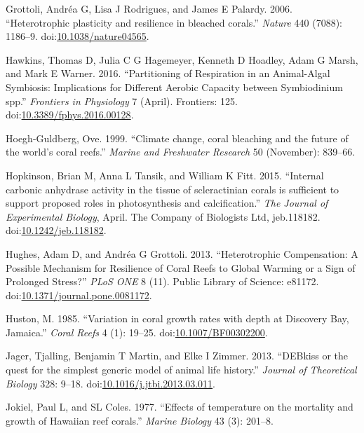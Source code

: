 \documentclass[]{elsarticle} %
\begin{document}
\hypertarget{ref-Grottoli:2006p3692}{}
Grottoli, Andréa G, Lisa J Rodrigues, and James E Palardy. 2006.
``Heterotrophic plasticity and resilience in bleached corals.''
\emph{Nature} 440 (7088): 1186--9.
doi:\href{https://doi.org/10.1038/nature04565}{10.1038/nature04565}.

\hypertarget{ref-Hawkins:2016jj}{}
Hawkins, Thomas D, Julia C G Hagemeyer, Kenneth D Hoadley, Adam G Marsh,
and Mark E Warner. 2016. ``Partitioning of Respiration in an
Animal-Algal Symbiosis: Implications for Different Aerobic Capacity
between Symbiodinium spp.'' \emph{Frontiers in Physiology} 7 (April).
Frontiers: 125.
doi:\href{https://doi.org/10.3389/fphys.2016.00128}{10.3389/fphys.2016.00128}.

\hypertarget{ref-HoeghGuldberg:1999p4222}{}
Hoegh-Guldberg, Ove. 1999. ``Climate change, coral bleaching and the
future of the world's coral reefs.'' \emph{Marine and Freshwater
Research} 50 (November): 839--66.

\hypertarget{ref-Hopkinson:2015ev}{}
Hopkinson, Brian M, Anna L Tansik, and William K Fitt. 2015. ``Internal
carbonic anhydrase activity in the tissue of scleractinian corals is
sufficient to support proposed roles in photosynthesis and
calcification.'' \emph{The Journal of Experimental Biology}, April. The
Company of Biologists Ltd, jeb.118182.
doi:\href{https://doi.org/10.1242/jeb.118182}{10.1242/jeb.118182}.

\hypertarget{ref-Hughes:2013hd}{}
Hughes, Adam D, and Andréa G Grottoli. 2013. ``Heterotrophic
Compensation: A Possible Mechanism for Resilience of Coral Reefs to
Global Warming or a Sign of Prolonged Stress?'' \emph{PLoS ONE} 8 (11).
Public Library of Science: e81172.
doi:\href{https://doi.org/10.1371/journal.pone.0081172}{10.1371/journal.pone.0081172}.

\hypertarget{ref-Huston:1985ec}{}
Huston, M. 1985. ``Variation in coral growth rates with depth at
Discovery Bay, Jamaica.'' \emph{Coral Reefs} 4 (1): 19--25.
doi:\href{https://doi.org/10.1007/BF00302200}{10.1007/BF00302200}.

\hypertarget{ref-Jager:2013bj}{}
Jager, Tjalling, Benjamin T Martin, and Elke I Zimmer. 2013. ``DEBkiss
or the quest for the simplest generic model of animal life history.''
\emph{Journal of Theoretical Biology} 328: 9--18.
doi:\href{https://doi.org/10.1016/j.jtbi.2013.03.011}{10.1016/j.jtbi.2013.03.011}.

\hypertarget{ref-Jokiel:1977p7353}{}
Jokiel, Paul L, and SL Coles. 1977. ``Effects of temperature on the
mortality and growth of Hawaiian reef corals.'' \emph{Marine Biology} 43
(3): 201--8.
\end{document}
